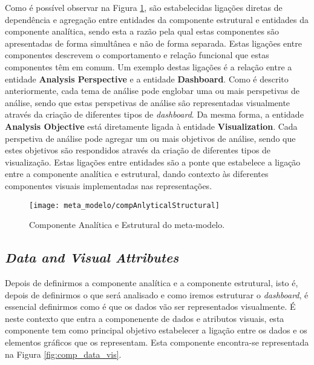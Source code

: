 Como é possível observar na Figura \ref{fig:comp_anal_struct}, são estabelecidas ligações diretas de dependência e agregação entre entidades da componente estrutural e entidades da componente analítica, sendo esta a razão pela qual estas componentes são apresentadas de forma simultânea e não de forma separada. Estas ligações entre componentes descrevem o comportamento e relação funcional que estas componentes têm em comum. Um exemplo destas ligações é a relação entre a entidade \textbf{Analysis Perspective} e a entidade \textbf{Dashboard}. Como é descrito anteriormente, cada tema de análise pode englobar uma ou mais perspetivas de análise, sendo que estas perspetivas de análise são representadas visualmente através da criação de diferentes tipos de \textit{dashboard}. Da mesma forma, a entidade \textbf{Analysis Objective} está diretamente ligada à entidade \textbf{Visualization}. Cada perspetiva de análise pode agregar um ou mais objetivos de análise, sendo que estes objetivos são respondidos através da criação de diferentes tipos de visualização. Estas ligações entre entidades são a ponte que estabelece a ligação entre a componente analítica e estrutural, dando contexto às diferentes componentes visuais implementadas nas representações.

\begin{figure}[htbp]
  \texttt{[image: meta\_modelo/compAnlyticalStructural]}
  \centering
  \caption{Componente Analítica e Estrutural do meta-modelo.}
  \label{fig:comp_anal_struct}
\end{figure}

\subsection{\textit{Data and Visual Attributes}} %
\label{sub:data_vis_attr}

Depois de definirmos a componente analítica e a componente estrutural, isto é, depois de definirmos o que será analisado e como iremos estruturar o \textit{dashboard}, é essencial definirmos como é que os dados vão ser representados visualmente. É neste contexto que entra a componenente de dados e atributos visuais, esta componente tem como principal objetivo estabelecer a ligação entre os dados e os elementos gráficos que os representam. Esta componente encontra-se representada na Figura \ref{fig:comp_data_vis}.


